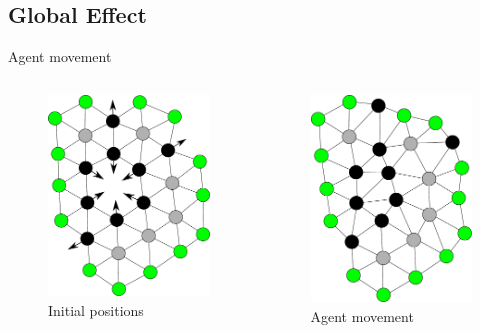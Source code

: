 \documentclass{beamer}
\begin{document}
\subsection{Global Effect}
\begin{frame}{Agent movement}
  \begin{columns}
      \begin{figure}
        \begin{center}
          \includegraphics[width=4.5cm]{PerimeterBotsCircle3.pdf}
        \end{center}
        \caption{Initial positions}
      \end{figure}
        \begin{figure}
          \begin{center}
            \includegraphics[width=4.5cm]{PerimeterBotsCircle4.pdf}
          \end{center}
          \caption{Agent movement}
        \end{figure}
    \end{columns}
\end{frame}  
\end{document}
